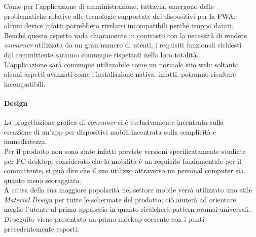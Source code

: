 \documentclass[12pt]{article}
\begin{document}
Come per l'applicazione di amministrazione, tuttavia, emergono delle problematiche relative alle tecnologie supportate dai dispositivi per la PWA: alcuni device infatti potrebbero rivelarsi incompatibili perché troppo datati.\\
Benché questo aspetto vada chiaramente in contrasto con la necessità di rendere \textit{consumer} utilizzata da un gran numero di utenti, i requisiti funzionali richiesti dal committente saranno comunque rispettati nella loro totalità.\\
L'applicazione sarà comunque utilizzabile come un normale sito web: soltanto alcuni aspetti avanzati come l'installazione nativa, infatti, potranno risultare incompatibili.\newpage
\paragraph{Design}
La progettazione grafica di \textit{consumer} si è esclusivamente incentrata sulla creazione di un'app per dispositivi mobili incentrata sulla semplicità e immediatezza.\\
Per il prodotto non sono state infatti previste versioni specificatamente studiate per PC desktop: considerato che la mobilità è un requisito fondamentale per il committente, si può dire che il suo utilizzo attraverso un personal computer sia quanto meno scoraggiato.\\
A causa della sua maggiore popolarità nel settore mobile verrà utilizzato uno stile \textit{Material Design} per tutte le schermate del prodotto; ciò aiuterà ad orientare meglio l'utente al primo approccio in quanto ricalcherà pattern oramai universali.
Di seguito viene presentato un primo mockup coerente con i punti precedentemente esposti:
\end{document}
